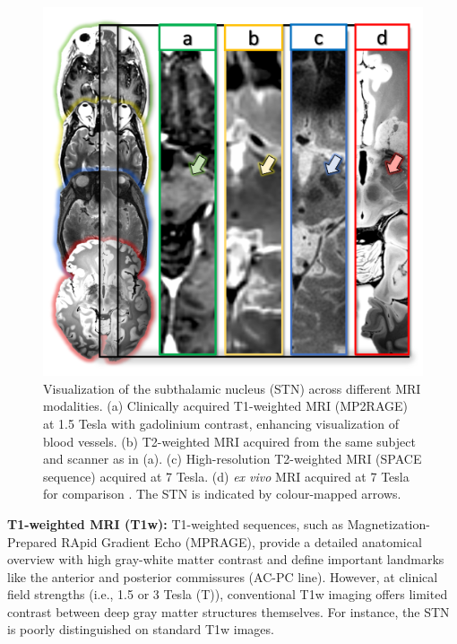 \begin{figure}[hbt!]
    \centering
    \includegraphics[width=1\linewidth]{figs/ch1_Figure_STN_MRI.png}
    \caption{
    Visualization of the subthalamic nucleus (STN) across different MRI modalities. (a) Clinically acquired T1-weighted MRI (MP2RAGE) at 1.5 Tesla with gadolinium contrast, enhancing visualization of blood vessels. (b) T2-weighted MRI acquired from the same subject and scanner as in (a). (c) High-resolution T2-weighted MRI (SPACE sequence) acquired at 7 Tesla. (d) \textit{ex vivo} MRI acquired at 7 Tesla for comparison \cite{Edlow2020-mo}. The STN is indicated by colour-mapped arrows.}
    \label{fig:ch1_Figure_STN_MRI}
\end{figure}

\textbf{T1-weighted MRI (T1w):} T1-weighted sequences, such as Magnetization-Prepared RApid Gradient Echo (MPRAGE), provide a detailed anatomical overview with high gray-white matter contrast \cite{Brant-Zawadzki1992-nw} and define important landmarks like the anterior and posterior commissures (AC-PC line). However, at clinical field strengths (i.e., 1.5 or 3 Tesla (T)), conventional T1w imaging offers limited contrast between deep gray matter structures themselves. For instance, the STN is poorly distinguished on standard T1w images.

